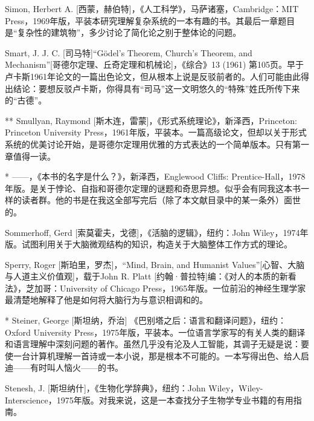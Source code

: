 \begin{thebib}
\begin{biblist}
\item Simon, Herbert A. [西蒙，赫伯特]，《人工科学》，马萨诸塞，Cambridge：MIT Press，1969年版，平装本研究理解复杂系统的一本有趣的书。其最后一章题目是“复杂性的建筑物”，多少讨论了简化论之别于整体论的问题。

\item Smart, J. J. C. [司马特]“Gödel's Theorem, Church's Theorem, and Mechanism”[哥德尔定理、丘奇定理和机械论]，《综合》13 (1961) 第105页。早于卢卡斯1961年论文的一篇出色论文，但从根本上说是反驳前者的。人们可能由此得出结论：要想反驳卢卡斯，你得具有“司马”这一文明悠久的“特殊”姓氏所传下来的“古德”。

\item[**] Smullyan, Raymond [斯木连，雷蒙]，《形式系统理论》，新泽西，Princeton: Princeton University Press，1961年版，平装本。一篇高级论文，但却以关于形式系统的优美讨论开始，是哥德尔定理用优雅的方式表达的一个简单版本。只有第一章值得一读。

\item[*]——，《本书的名字是什么？》，新泽西，Englewood Cliffs: Prentice-Hall，1978年版。是关于悖论、自指和哥德尔定理的谜题和奇思异想。似乎会有同我这本书一样的读者群。他的书是在我这全部写完后（除了本文献目录中的某一条外）面世的。

\item Sommerhoff, Gerd [索莫霍夫，戈德]，《活脑的逻辑》，纽约：John Wiley，1974年版。试图利用关于大脑微观结构的知识，构造关于大脑整体工作方式的理论。

\item Sperry, Roger [斯珀里，罗杰]，“Mind, Brain, and Humanist Values”[心智、大脑与人道主义价值观]，载于John R. Platt [约翰·普拉特]编：《对人的本质的新看法》，芝加哥：University of Chicago Press，1965年版。一位前沿的神经生理学家最清楚地解释了他是如何将大脑行为与意识相调和的。

\item[*] Steiner, George [斯坦纳，乔治] 《巴别塔之后：语言和翻译问题》，纽约：Oxford University Press，1975年版，平装本。一位语言学家写的有关人类的翻译和语言理解中深刻问题的著作。虽然几乎没有沦及人工智能，其调子无疑是说：要使一台计算机理解一首诗或一本小说，那是根本不可能的。一本写得出色、给人启迪——有时叫人恼火——的书。

\item Stenesh, J. [斯坦纳什]，《生物化学辞典》，纽约：John Wiley，Wiley-Interscience，1975年版。对我来说，这是一本查找分子生物学专业书籍的有用指南。


\end{biblist}
\end{thebib}

